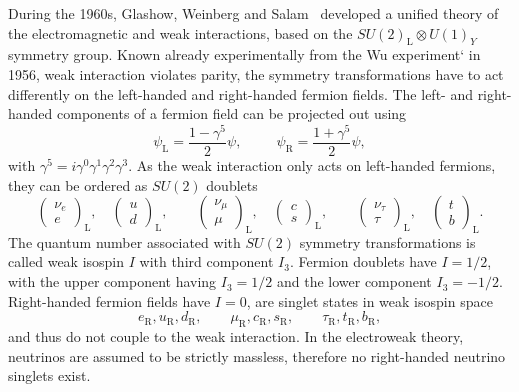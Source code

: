During the 1960s, Glashow, Weinberg and Salam~\cite{GLASHOW1961579,PhysRevLett.19.1264,Salam1959} developed a unified theory of the electromagnetic and weak interactions, based on the $SU(2)_\mathrm{L}\otimes U(1)_Y$ symmetry group. Known already experimentally from the Wu experiment`\cite{PhysRev.105.1413} in 1956, weak interaction violates parity, \ie the symmetry transformations have to act differently on the left-handed and right-handed fermion fields. The left- and right-handed components of a fermion field can be projected out using
\begin{equation}
	\psi_\mathrm{L} = \frac{1-\gamma^5}{2}\psi , \ \ \qquad 	\psi_\mathrm{R} = \frac{1+\gamma^5}{2}\psi,
\end{equation}
with $\gamma^5 = i\gamma^0\gamma^1\gamma^2\gamma^3$. As the weak interaction only acts on left-handed fermions, they can be ordered as $SU(2)$ doublets
\begin{equation}
	\begin{pmatrix}
		\nu_e \\
		e
	\end{pmatrix}_\mathrm{L},
	\quad
	\begin{pmatrix}
		u \\
		d
	\end{pmatrix}_\mathrm{L},
	\qquad
	\begin{pmatrix}
		\nu_\mu \\
		\mu
	\end{pmatrix}_\mathrm{L},
	\quad
	\begin{pmatrix}
		c \\
		s
	\end{pmatrix}_\mathrm{L},
	\qquad
	\begin{pmatrix}
		\nu_\tau \\
		\tau
	\end{pmatrix}_\mathrm{L},
	\quad
	\begin{pmatrix}
		t \\
		b
	\end{pmatrix}_\mathrm{L}.
\end{equation} 
The quantum number associated with $SU(2)$ symmetry transformations is called weak isospin $I$ with third component $I_3$. Fermion doublets have $I=1/2$, with the upper component having $I_3 = 1/2$ and the lower component $I_3=-1/2$. Right-handed fermion fields have $I=0$, \ie are singlet states in weak isospin space
\begin{equation}
	e_\mathrm{R},u_\mathrm{R},d_\mathrm{R}, \qquad \mu_\mathrm{R},c_\mathrm{R},s_\mathrm{R}, \qquad \tau_\mathrm{R},t_\mathrm{R},b_\mathrm{R}, 
\end{equation}
and thus do not couple to the weak interaction. In the electroweak theory, neutrinos are assumed to be strictly massless, therefore no right-handed neutrino singlets exist. 

